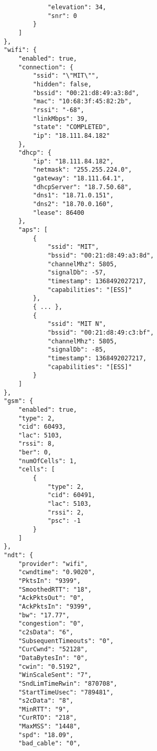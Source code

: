 \begin{verbatim}
                    "elevation": 34,
                    "snr": 0
                }
            ]
        },
        "wifi": {
            "enabled": true,
            "connection": {
                "ssid": "\"MIT\"",
                "hidden": false,
                "bssid": "00:21:d8:49:a3:8d",
                "mac": "10:68:3f:45:82:2b",
                "rssi": "-68",
                "linkMbps": 39,
                "state": "COMPLETED",
                "ip": "18.111.84.182"
            },
            "dhcp": {
                "ip": "18.111.84.182",
                "netmask": "255.255.224.0",
                "gateway": "18.111.64.1",
                "dhcpServer": "18.7.50.68",
                "dns1": "18.71.0.151",
                "dns2": "18.70.0.160",
                "lease": 86400
            },
            "aps": [
                {
                    "ssid": "MIT",
                    "bssid": "00:21:d8:49:a3:8d",
                    "channelMhz": 5805,
                    "signalDb": -57,
                    "timestamp": 1368492027217,
                    "capabilities": "[ESS]"
                },
                { ... },
                {
                    "ssid": "MIT N",
                    "bssid": "00:21:d8:49:c3:bf",
                    "channelMhz": 5805,
                    "signalDb": -85,
                    "timestamp": 1368492027217,
                    "capabilities": "[ESS]"
                }
            ]
        },
        "gsm": {
            "enabled": true,
            "type": 2,
            "cid": 60493,
            "lac": 5103,
            "rssi": 8,
            "ber": 0,
            "numOfCells": 1,
            "cells": [
                {
                    "type": 2,
                    "cid": 60491,
                    "lac": 5103,
                    "rssi": 2,
                    "psc": -1
                }
            ]
        },
        "ndt": {
            "provider": "wifi",
            "cwndtime": "0.9020",
            "PktsIn": "9399",
            "SmoothedRTT": "18",
            "AckPktsOut": "0",
            "AckPktsIn": "9399",
            "bw": "17.77",
            "congestion": "0",
            "c2sData": "6",
            "SubsequentTimeouts": "0",
            "CurCwnd": "52128",
            "DataBytesIn": "0",
            "cwin": "0.5192",
            "WinScaleSent": "7",
            "SndLimTimeRwin": "870708",
            "StartTimeUsec": "789481",
            "s2cData": "8",
            "MinRTT": "9",
            "CurRTO": "218",
            "MaxMSS": "1448",
            "spd": "18.09",
            "bad_cable": "0",

\end{verbatim}
